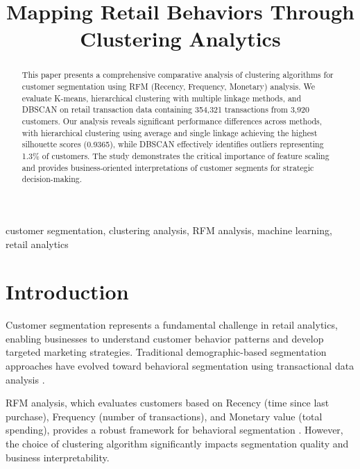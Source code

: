 \documentclass[conference]{IEEEtran}
\begin{document}
\title{Mapping Retail Behaviors Through Clustering Analytics}

\author{
}

\maketitle

\begin{abstract}
This paper presents a comprehensive comparative analysis of clustering algorithms for customer segmentation using RFM (Recency, Frequency, Monetary) analysis. We evaluate K-means, hierarchical clustering with multiple linkage methods, and DBSCAN on retail transaction data containing 354,321 transactions from 3,920 customers. Our analysis reveals significant performance differences across methods, with hierarchical clustering using average and single linkage achieving the highest silhouette scores (0.9365), while DBSCAN effectively identifies outliers representing 1.3\% of customers. The study demonstrates the critical importance of feature scaling and provides business-oriented interpretations of customer segments for strategic decision-making.
\end{abstract}

\begin{IEEEkeywords}
customer segmentation, clustering analysis, RFM analysis, machine learning, retail analytics
\end{IEEEkeywords}

\section{Introduction}

Customer segmentation represents a fundamental challenge in retail analytics, enabling businesses to understand customer behavior patterns and develop targeted marketing strategies. Traditional demographic-based segmentation approaches have evolved toward behavioral segmentation using transactional data analysis \cite{b1}.

RFM analysis, which evaluates customers based on Recency (time since last purchase), Frequency (number of transactions), and Monetary value (total spending), provides a robust framework for behavioral segmentation \cite{b2}. However, the choice of clustering algorithm significantly impacts segmentation quality and business interpretability.
\end{document}
